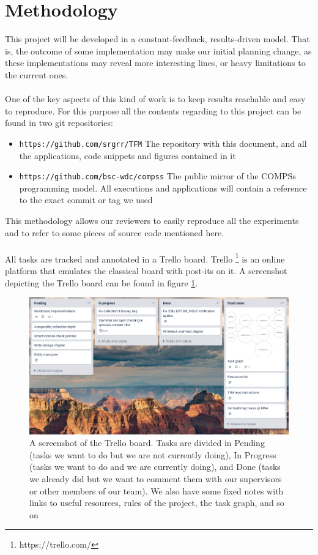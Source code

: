 \section{Methodology}

This project will be developed in a constant-feedback, results-driven model. That is, the outcome of some implementation may make our initial planning change, as these implementations may reveal more interesting lines, or heavy limitations to the current ones.\\
\\
One of the key aspects of this kind of work is to keep results reachable and easy to reproduce. For this purpose all the contents regarding to this project can be found in two git repositories:
\begin{itemize}
\item \verb|https://github.com/srgrr/TFM| The repository with this document, and all the applications, code snippets and figures contained in it
\item \verb|https://github.com/bsc-wdc/compss| The public mirror of the COMPSs programming model. All executions and applications will contain a reference to the exact commit or tag we used
\end{itemize}
This methodology allows our reviewers to easily reproduce all the experiments and to refer to some pieces of source code mentioned here.\\
\\
All tasks are tracked and annotated in a Trello board. Trello \footnote{https://trello.com/} is an online platform that emulates the classical board with post-its on it. A screenshot depicting the Trello board can be found in figure \ref{fig:trello}.

\begin{figure}
\centering
\includegraphics[scale = 0.5]{figures/trello.png}
\caption{A screenshot of the Trello board. Tasks are divided in Pending (tasks we want to do but we are not currently doing), In Progress (tasks we want to do and we are currently doing), and Done (tasks we already did but we want to comment them with our supervisors or other members of our team). We also have some fixed notes with links to useful resources, rules of the project, the task graph, and so on}
\label{fig:trello}
\end{figure}